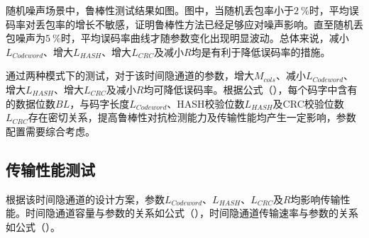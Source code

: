 随机噪声场景中，鲁棒性测试结果如图。图中，当随机丢包率小于{$2\ \%$}时，平均误码率对丢包率的增长不敏感，证明鲁棒性方法已经足够应对噪声影响。直至随机丢包噪声为{$5\ \%$}时，平均误码率曲线才随参数变化出现明显波动。总体来说，减小$L_{Codeword}$、增大$L_{HASH}$、增大$L_{CRC}$及减小$R$均是有利于降低误码率的措施。

通过两种模式下的测试，对于该时间隐通道的参数，增大$M_{cols}$、减小$L_{Codeword}$、增大$L_{HASH}$、增大$L_{CRC}$及减小$R$均可降低误码率。根据公式（），每个码字中含有的数据位数$BL$，与码字长度$L_{Codeword}$、HASH校验位数$L_{HASH}$及CRC校验位数$L_{CRC}$存在密切关系，提高鲁棒性对抗检测能力及传输性能均产生一定影响，参数配置需要综合考虑。

\subsection{传输性能测试}
\label{chap:hash:result:throughput}

根据该时间隐通道的设计方案，参数$L_{Codeword}$、$L_{HASH}$、$L_{CRC}$及$R$均影响传输性能。时间隐通道容量与参数的关系如公式（），时间隐通道传输速率与参数的关系如公式（）。


